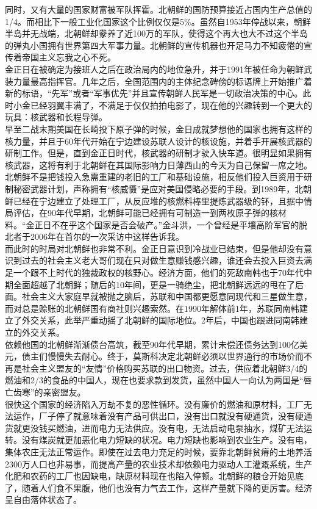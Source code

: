 \begin{multicols}{\theparacolNo}
同时，又有大量的国家财富被军队挥霍。北朝鲜的国防预算接近占国内生产总值的1/4。而相比下一般工业化国家这个比例仅仅是5\%。虽然自1953年停战以来，朝鲜半岛并无战端，北朝鲜却豢养了近100万的军队，使得这个再大也大不过这个半岛的弹丸小国拥有世界第四大军事力量。北朝鲜的宣传机器也开足马力不知疲倦的宣传着帝国主义忘我之心不死。\\

金正日在被确定为接班人之后在政治局内的地位急升，并于1991年被任命为朝鲜武装力量最高指挥官。几年之后，全国范围内的主体纪念碑傍的标语牌上开始推广着新的标语，“先军”或者“军事优先”并且宣传朝鲜人民军是一切政治决策的中心。此时小金已经羽翼丰满了，不满足于仅仅拍拍电影了，现在他的兴趣转到一个更大的玩具：核武器和长程导弹。\\

早至二战末期美国在长崎投下原子弹的时候，金日成就梦想他的国家也拥有这样的核力量，并且于60年代开始在宁边建设苏联人设计的核设施，并着手开展核武器的研制工作。但是，直到金正日时代，核武器的研制才驶入快车道。很明显如果拥有核武器，这将有利于北朝鲜在其国际影响力日薄西山的今天为自己保留一席之地。北朝鲜不是把钱投入急需重建的老旧的工厂和基础设施，相反他们投入巨资用于研制秘密武器计划，声称拥有“核威慑”是应对美国侵略必要的手段。到1989年，北朝鲜已经在宁边建立了处理工厂，从反应堆的核燃料棒里提炼武器级的钚，且据中情局评估，在90年代早期，北朝鲜可能已经拥有可制造一到两枚原子弹的核材料。“金正日不在乎这个国家是否会破产。”金斗洪，一个曾经是平壤高阶军官的脱北者于2006年在首尔的一次采访中这样告诉我。\\

而此时的时局对北朝鲜也非常不利。金正日意识到冷战业已结束，但是他却没有意识到过去的社会主义老大哥们现在只对做生意赚钱感兴趣，谁还会去投入巨资去满足一个跟不上时代的独裁政权的核野心。经济方面，他们的死敌南韩也于70年代中期全面超越了北朝鲜；随后的10年间，更是一骑绝尘，把北朝鲜远远的甩在了后面。社会主义大家庭早就被抛之脑后，苏联和中国都更愿意同现代和三星做生意，而对总是赊账的北朝鲜国有商社则兴趣索然。在1990年解体前1年，苏联同南韩建立了外交关系，此举严重动摇了北朝鲜的国际地位。2年后，中国也跟进同南韩建立的外交关系。\\

依赖他国的北朝鲜渐渐债台高筑，截至90年代早期，累计未偿还债务达到100亿美元，债主们慢慢失去耐心。终于，莫斯科决定北朝鲜必须以世界通行的市场价而不再是社会主义盟友的“友情”价格购买苏联的出口物资。过去，供应着北朝鲜3/4的燃油和2/3的食品的中国人，现在也要求款到发货，虽然中国人一向认为两国是“唇亡齿寒”的亲密盟友。\\

很快这个国家的经济陷入万劫不复的恶性循环。没有廉价的燃油和原材料，工厂无法运作，厂子停了就意味着没有产品可供出口，没有出口就没有硬通货，没有硬通货就更没钱买燃油，进而电力无法供应。没有电，无法启动电泵抽水，煤矿无法运转。没有煤炭就更加恶化电力短缺的状况。电力短缺也影响到农业生产。没有电，集体农庄无法正常运作。即使在过去电力充足的时候，要靠北朝鲜贫瘠的土地养活2300万人口也非易事，而提高产量的农业技术却依赖电力驱动人工灌溉系统，生产化肥和农药的工厂也因缺电，缺原材料现在也陷入停顿。北朝鲜的粮仓开始见底了，随着人们食不果腹，他们也没有力气去工作，这样产量就下降的更厉害。经济呈自由落体状态了。\\


\end{multicols}
